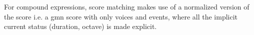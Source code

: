 \documentclass[10pt,a4paper,frenchb]{article}
\makeatletter
\newcommand{\applyop}	{\ensuremath{@}}
\newcommand{\seq}			{:}
\makeatother
\begin{document}
For compound expressions, score matching makes use of a normalized version of the score i.e. a gmn score with only voices and events, where all the implicit current status (duration, octave) is made explicit. 




\end{document}
